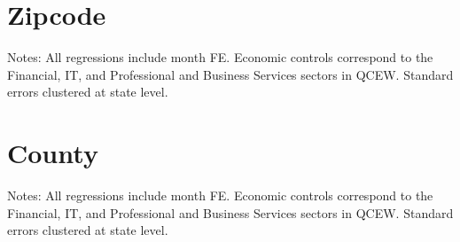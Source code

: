 \documentclass{article}
\begin{document}
\section{Zipcode}
\begin{table} \centering
	\scalebox{.74}
	{}
	\begin{minipage}{.95\textwidth} \scriptsize
		\vspace{2mm}
		Notes: All regressions include month FE.
		Economic controls correspond to the Financial, IT, and Professional 
		and Business Services sectors in QCEW. Standard errors clustered at 
		state level.
	\end{minipage}
\end{table}

\section{County}
\begin{table} \centering
	\scalebox{.74}
	{}
	\begin{minipage}{.95\textwidth} \scriptsize
		\vspace{2mm}
		Notes: All regressions include month FE.
		Economic controls correspond to the Financial, IT, and Professional 
		and Business Services sectors in QCEW. Standard errors clustered at 
		state level.
	\end{minipage}
\end{table}
\end{document}
